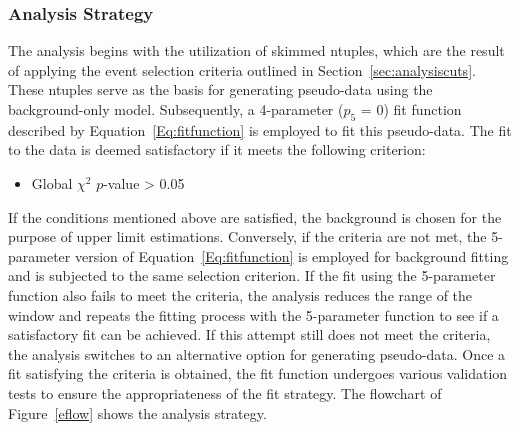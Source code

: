 \subsubsection{Analysis Strategy}

The analysis begins with the utilization of skimmed ntuples, which are the result of applying the event selection criteria outlined in Section~\ref{sec:analysiscuts}. These ntuples serve as the basis for generating pseudo-data using the background-only model. Subsequently, a 4-parameter ($p_5$ = 0) fit function described by Equation~\ref{Eq:fitfunction} is employed to fit this pseudo-data. The fit to the data is deemed satisfactory if it meets the following criterion:

\begin{itemize}
	\item Global $\chi^2$ $p$-value > 0.05
\end{itemize}

If the conditions mentioned above are satisfied, the background is chosen for the purpose of upper limit estimations. Conversely, if the criteria are not met, the 5-parameter version of Equation~\ref{Eq:fitfunction} is employed for background fitting and is subjected to the same selection criterion. If the fit using the 5-parameter function also fails to meet the criteria, the analysis reduces the range of the window and repeats the fitting process with the 5-parameter function to see if a satisfactory fit can be achieved. If this attempt still does not meet the criteria, the analysis switches to an alternative option for generating pseudo-data. Once a fit satisfying the criteria is obtained, the fit function undergoes various validation tests to ensure the appropriateness of the fit strategy. The flowchart of Figure~\ref{eflow} shows the analysis strategy.

